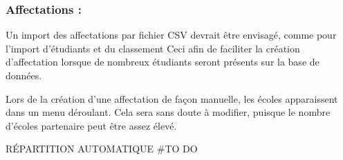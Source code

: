 \subsubsection{Affectations :}
Un import des affectations par fichier CSV devrait être envisagé, comme pour l'import d'étudiants et du classement Ceci afin de faciliter la création d'affectation lorsque de nombreux étudiants seront présents sur la base de données.

Lors de la création d'une affectation de façon manuelle, les écoles apparaissent dans un menu déroulant. Cela sera sans doute à modifier, puisque le nombre d'écoles partenaire peut être assez élevé.

RÉPARTITION AUTOMATIQUE #TO DO

